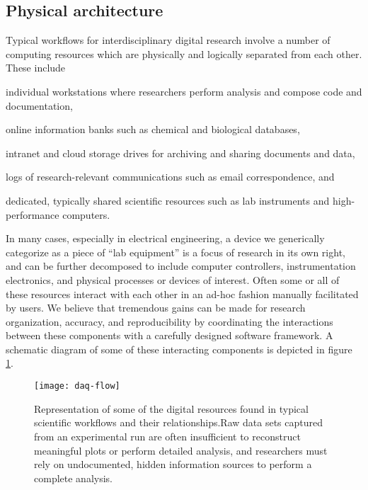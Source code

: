 \documentclass[../thesis]{subfiles}
\begin{document}
\subsection{Physical architecture}
Typical workflows for interdisciplinary digital research involve a
number of computing resources which are physically and logically
separated from each other. These include
\begin{enumerate*}[label=(\roman*)]
  \item{
      individual workstations where researchers perform analysis and
      compose code and documentation,
  }
  \item{
      online information banks such as chemical and biological
      databases,
  }
  \item{
      intranet and cloud storage drives for archiving and sharing
      documents and data,
  }
  \item{
      logs of research-relevant communications such as email
      correspondence, and
  }
  \item{
      dedicated, typically shared scientific resources such as lab
      instruments and high-performance computers.
  }
\end{enumerate*}
In many cases, especially in electrical engineering, a
device we generically categorize as a piece of ``lab equipment'' is a
focus of research in its own right, and can be further decomposed to
include computer controllers, instrumentation electronics, and
physical processes or devices of interest. Often some or all of these
resources interact with each other in an ad-hoc fashion manually
facilitated by users. We believe that tremendous gains can be made for
research organization, accuracy, and reproducibility by coordinating
the interactions between these components with a carefully designed
software framework. A schematic diagram of some of these interacting
components is depicted in figure \ref{fig:DAQFlow}.

\begin{figure}
  \texttt{[image: daq-flow]}
  \caption{
    Representation of some of the digital resources found in
    typical scientific workflows and their relationships.Raw data sets
    captured from an experimental run are often insufficient to
    reconstruct meaningful plots or perform detailed analysis, and
    researchers must rely on undocumented, hidden information sources
    to perform a complete analysis.
    \label{fig:DAQFlow}
  }
\end{figure}
\end{document}
